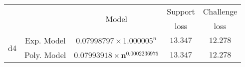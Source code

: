 \begin{tabular}{ccccc} 
\hline 
 &  & \multirow{2}{*}{Model} & Support & Challenge\tabularnewline 
 &  &  & loss  & loss\tabularnewline 
\hline 
\hline 
\multirow{2}{*}{d4} & Exp. Model & $0.07998797\times 1.000005^{n}$ & $13.347$ & $12.278$ \tabularnewline 
 & Poly. Model & $\mathbf{0.07993918\times n^{0.0002236975}}$ & $\mathbf{13.347}$ & $\mathbf{12.278}$ \tabularnewline 
\hline 
\end{tabular} 

